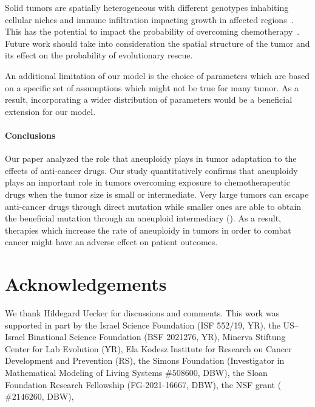 \documentclass[12pt]{extarticle}
\begin{document}
Solid tumors are spatially heterogeneous with different genotypes inhabiting cellular niches and immune infiltration impacting growth in affected regions~\citep{varrone2023cellcharter,galon2010immune}. This has the potential to impact the probability of overcoming chemotherapy~\citep{martens2011spatial}. Future work should take into consideration the spatial structure of the tumor and its effect on the probability of evolutionary rescue.

An additional limitation of our model is the choice of parameters which are based on a specific set of assumptions which might not be true for many tumor. As a result, incorporating a wider distribution of parameters would be a beneficial extension for our model.
\paragraph{Conclusions}

Our paper analyzed the role that aneuploidy plays in tumor adaptation to the effects of anti-cancer drugs. Our study quantitatively confirms that aneuploidy plays an important role in tumors overcoming exposure to chemotherapeutic drugs when the tumor size is small or intermediate. Very large tumors can escape anti-cancer drugs through direct mutation while smaller ones are able to obtain the beneficial mutation through an aneuploid intermediary (). As a result, therapies which increase the rate of aneuploidy in tumors in order to combat cancer might have an adverse effect on patient outcomes.

{\small
\section*{Acknowledgements}
We thank Hildegard Uecker for discussions and comments. 
This work was supported in part by
the Israel Science Foundation (ISF 552/19, YR),
the US–Israel Binational Science Foundation (BSF 2021276, YR), 
Minerva Stiftung Center for Lab Evolution (YR), 
Ela Kodesz Institute for Research on Cancer Development and Prevention (RS),
the Simons Foundation (Investigator in Mathematical Modeling of Living Systems $\#508600$, DBW),
the Sloan Foundation Research Fellowship (FG-2021-16667, DBW),
the NSF grant ($\#2146260$, DBW),
}
\end{document}
